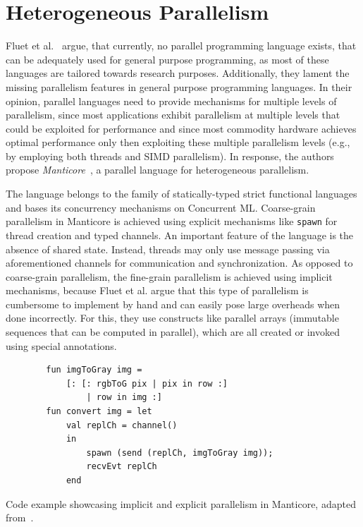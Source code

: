 \section{Heterogeneous Parallelism}
\label{sec:related:manticore}
Fluet et al.~\cite{fluet2007manticore} argue, that currently, no parallel programming language exists, that can be adequately used for general purpose programming, as most of these languages are tailored towards research purposes.
Additionally, they lament the missing parallelism features in general purpose programming languages.
In their opinion, parallel languages need to provide mechanisms for multiple levels of parallelism, since most applications exhibit parallelism at multiple levels that could be exploited for performance and since most commodity hardware achieves optimal performance only then exploiting these multiple parallelism levels (e.g., by employing both threads and SIMD parallelism).
In response, the authors propose \emph{Manticore}~\cite{fluet2007manticore, fluet2007status, fluet2009programming, fluet2010implicitly}, a parallel language for heterogeneous parallelism.

The language belongs to the family of statically-typed strict functional languages and bases its concurrency mechanisms on Concurrent ML.
Coarse-grain parallelism in Manticore is achieved using explicit mechanisms like \texttt{spawn} for thread creation and typed channels.
An important feature of the language is the absence of shared state.
Instead, threads may only use message passing via aforementioned channels for communication and synchronization.
As opposed to coarse-grain parallelism, the fine-grain parallelism is achieved using implicit mechanisms, because Fluet et al. argue that this type of parallelism is cumbersome to implement by hand and can easily pose large overheads when done incorrectly.
For this, they use constructs like parallel arrays (immutable sequences that can be computed in parallel), which are all created or invoked using special annotations.

\begin{listing}[h]
    \begin{verbatim}
        fun imgToGray img =
            [: [: rgbToG pix | pix in row :]
                | row in img :]
        fun convert img = let
            val replCh = channel()
            in
                spawn (send (replCh, imgToGray img));
                recvEvt replCh
            end
    \end{verbatim}
    \caption{Code example showcasing implicit and explicit parallelism in Manticore, adapted from~\cite{fluet2007manticore}.}%
    \label{fig:related:manticore}
\end{listing}

